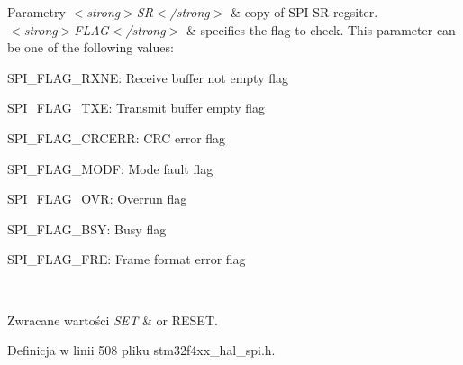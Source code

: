 \begin{DoxyParams}{Parametry}
{\em $<$strong$>$\+S\+R$<$/strong$>$} & copy of S\+PI SR regsiter. \\
\hline
{\em $<$strong$>$\+F\+L\+A\+G$<$/strong$>$} & specifies the flag to check. This parameter can be one of the following values\+: \begin{DoxyItemize}
\item S\+P\+I\+\_\+\+F\+L\+A\+G\+\_\+\+R\+X\+NE\+: Receive buffer not empty flag \item S\+P\+I\+\_\+\+F\+L\+A\+G\+\_\+\+T\+XE\+: Transmit buffer empty flag \item S\+P\+I\+\_\+\+F\+L\+A\+G\+\_\+\+C\+R\+C\+E\+RR\+: C\+RC error flag \item S\+P\+I\+\_\+\+F\+L\+A\+G\+\_\+\+M\+O\+DF\+: Mode fault flag \item S\+P\+I\+\_\+\+F\+L\+A\+G\+\_\+\+O\+VR\+: Overrun flag \item S\+P\+I\+\_\+\+F\+L\+A\+G\+\_\+\+B\+SY\+: Busy flag \item S\+P\+I\+\_\+\+F\+L\+A\+G\+\_\+\+F\+RE\+: Frame format error flag \end{DoxyItemize}
\\
\hline
\end{DoxyParams}

\begin{DoxyRetVals}{Zwracane wartości}
{\em S\+ET} & or R\+E\+S\+ET. \\
\hline
\end{DoxyRetVals}


Definicja w linii 508 pliku stm32f4xx\+\_\+hal\+\_\+spi.\+h.

\mbox{\label{group___s_p_i___private___macros_ga8ab087388d8930531498165ac8f066a2}} 
